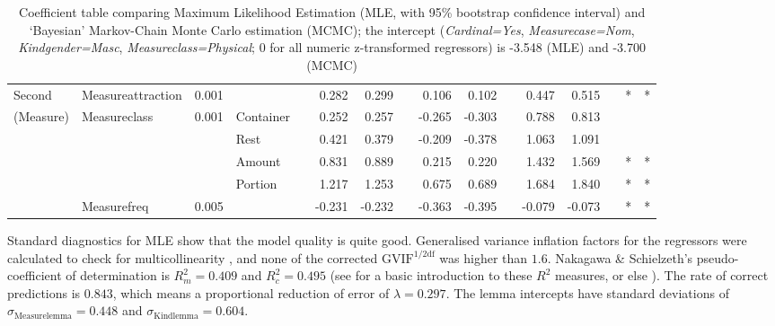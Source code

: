 \documentclass[USenglish]{article}
\begin{document}
\begin{table}
{\begin{tabular}{llrlp{0.5em}rrp{0.5em}rrp{0.5em}rrp{0.5em}cc}
       Second    & Measureattraction &  0.001 &           &&  0.282 &  0.299 &&  0.106 &  0.102 &&  0.447 &  0.515 && * & * \\
       (Measure) & Measureclass      &  0.001 & Container &&  0.252 &  0.257 && -0.265 & -0.303 &&  0.788 &  0.813 &&   &   \\
                 &                   &        & Rest      &&  0.421 &  0.379 && -0.209 & -0.378 &&  1.063 &  1.091 &&   &   \\
                 &                   &        & Amount    &&  0.831 &  0.889 &&  0.215 &  0.220 &&  1.432 &  1.569 && * & * \\
                 &                   &        & Portion   &&  1.217 &  1.253 &&  0.675 &  0.689 &&  1.684 &  1.840 && * & * \\
                 & Measurefreq       &  0.005 &           && -0.231 & -0.232 && -0.363 & -0.395 && -0.079 & -0.073 && * & * \\

  \end{tabular}
  }
  \caption{Coefficient table comparing Maximum Likelihood Estimation (MLE, with 95\% bootstrap confidence interval) and `Bayesian' Markov-Chain Monte Carlo estimation (MCMC); the intercept (\textit{Cardinal=Yes}, \textit{Measurecase=Nom}, \textit{Kindgender=Masc}, \textit{Measureclass=Physical}; 0 for all numeric z-transformed regressors) is -3.548 (MLE) and -3.700 (MCMC)}
  \label{tab:bigtable}
\end{table}


Standard diagnostics for MLE show that the model quality is quite good.
Generalised variance inflation factors for the regressors were calculated to check for multicollinearity \citep{FoxMonette1992,ZuurEa2010}, and none of the corrected $\text{GVIF}^{1/2\text{df}}$ was higher than $1.6$.
Nakagawa \& Schielzeth's pseudo-coefficient of determination is $R_m^2=0.409$ and $R^2_c=0.495$ (see \citealp{Gries2015} for a basic introduction to these $R^2$ measures, or else \citealp{NakagawaSchielzeth2013}).
The rate of correct predictions is $0.843$, which means a proportional reduction of error of $\lambda=0.297$.
The lemma intercepts have standard deviations of $\sigma_{\text{Measurelemma}}=0.448$ and $\sigma_{\text{Kindlemma}}=0.604$.
\end{document}
